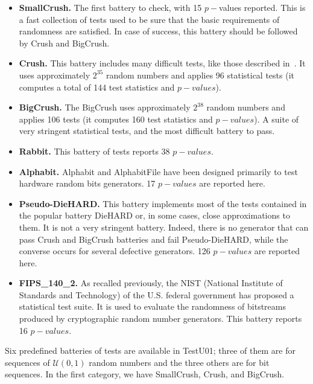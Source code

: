\begin{itemize}
\item{\textbf{SmallCrush.}} The first battery to check, with 15 $p-$values reported. This is a fast collection of tests used to be sure that the basic requirements of randomness are satisfied. In case of success, this battery should be followed by Crush and BigCrush.
\item{\textbf{Crush.}} This battery includes many difficult tests, like those described in~\cite{Knuth1998}. %
It uses approximately $2^{35}$ random numbers and applies 96 statistical tests
(it computes a total of 144 test statistics and $p-values$).
\item{\textbf{BigCrush.}} The BigCrush uses
approximately $2^{38}$ random numbers and applies 106 tests (it computes 160 test
statistics and $p-values$). 
A suite of very stringent statistical tests, and the most difficult battery to pass.
\item{\textbf{Rabbit.}} This battery of tests reports 38 $p-values$.
\item{\textbf{Alphabit.}} Alphabit and AlphabitFile have been designed primarily to test hardware random bits generators. 17 $p-values$ are reported here.
\item{\textbf{Pseudo-DieHARD.}} This battery implements most of the tests contained in the popular battery DieHARD or, in some cases, close approximations to them. It is not a very stringent battery. Indeed, there is no generator that can pass Crush and BigCrush batteries and fail Pseudo-DieHARD, while the converse occurs for several defective generators. 126 $p-values$ are reported here.
\item{\textbf{FIPS\_140\_2.}} As recalled previously, the NIST (National Institute of Standards and Technology) of the U.S. federal government has proposed a statistical test suite. It is used to evaluate the randomness of bitstreams produced by cryptographic random number generators. This battery reports 16 $p-values$.
\end{itemize}

Six predefined batteries of tests are available in TestU01; three of them
are for sequences of $\mathcal{U}(0, 1)$ random numbers and the three others are for bit
sequences. In the first category, we have SmallCrush, Crush, and BigCrush.

